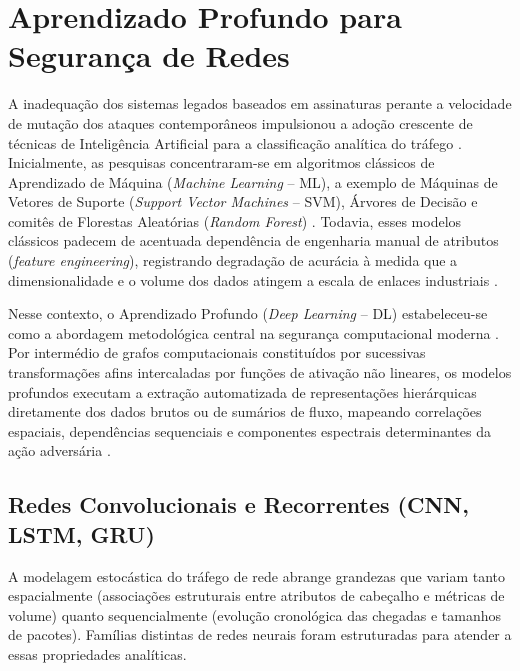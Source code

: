 \section{Aprendizado Profundo para Segurança de Redes}
\label{sec:deep_learning_seguranca}

A inadequação dos sistemas legados baseados em assinaturas perante a velocidade de mutação dos ataques contemporâneos impulsionou a adoção crescente de técnicas de Inteligência Artificial para a classificação analítica do tráfego \cite{survey2025dl, neuralcyber2025}. Inicialmente, as pesquisas concentraram-se em algoritmos clássicos de Aprendizado de Máquina (\emph{Machine Learning} -- ML), a exemplo de Máquinas de Vetores de Suporte (\emph{Support Vector Machines} -- SVM), Árvores de Decisão e comitês de Florestas Aleatórias (\emph{Random Forest}) \cite{feature2018}. Todavia, esses modelos clássicos padecem de acentuada dependência de engenharia manual de atributos (\emph{feature engineering}), registrando degradação de acurácia à medida que a dimensionalidade e o volume dos dados atingem a escala de enlaces industriais \cite{advancedids2024}.

Nesse contexto, o Aprendizado Profundo (\emph{Deep Learning} -- DL) estabeleceu-se como a abordagem metodológica central na segurança computacional moderna \cite{survey2025dl}. Por intermédio de grafos computacionais constituídos por sucessivas transformações afins intercaladas por funções de ativação não lineares, os modelos profundos executam a extração automatizada de representações hierárquicas diretamente dos dados brutos ou de sumários de fluxo, mapeando correlações espaciais, dependências sequenciais e componentes espectrais determinantes da ação adversária \cite{temporal2025, timematters2025}.

\subsection{Redes Convolucionais e Recorrentes (CNN, LSTM, GRU)}
\label{subsec:cnn_lstm_gru}

A modelagem estocástica do tráfego de rede abrange grandezas que variam tanto espacialmente (associações estruturais entre atributos de cabeçalho e métricas de volume) quanto sequencialmente (evolução cronológica das chegadas e tamanhos de pacotes). Famílias distintas de redes neurais foram estruturadas para atender a essas propriedades analíticas.

